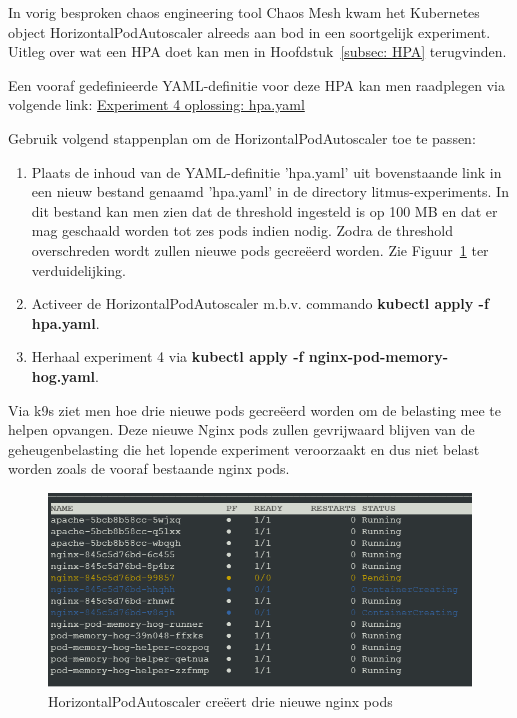 In vorig besproken chaos engineering tool Chaos Mesh kwam het Kubernetes object HorizontalPodAutoscaler alreeds aan bod in een soortgelijk experiment. Uitleg over wat een HPA doet kan men in Hoofdstuk~\ref{subsec: HPA} terugvinden.   

Een vooraf gedefinieerde YAML-definitie voor deze HPA kan men raadplegen via volgende link: \href{https://github.com/KenBruggeman/BP\textunderscore 21-22/blob/master/bachelorproef/docs/litmus%20experimenten/hpa.yaml}{Experiment 4 oplossing: hpa.yaml}

Gebruik volgend stappenplan om de HorizontalPodAutoscaler toe te passen:
\begin{enumerate}
    \item Plaats de inhoud van de YAML-definitie 'hpa.yaml' uit bovenstaande link in een nieuw bestand genaamd 'hpa.yaml' in de directory litmus-experiments. In dit bestand kan men zien dat de threshold ingesteld is op 100 MB en dat er mag geschaald worden tot zes pods indien nodig. Zodra de threshold overschreden wordt zullen nieuwe pods gecreëerd worden. Zie Figuur~\ref{img:threshold} ter verduidelijking.
    \item Activeer de HorizontalPodAutoscaler m.b.v. commando {\bf kubectl apply -f hpa.yaml}.
    \item Herhaal experiment 4 via {\bf kubectl apply -f nginx-pod-memory-hog.yaml}.
\end{enumerate}    
  
Via k9s ziet men hoe drie nieuwe pods gecreëerd worden om de belasting mee te helpen opvangen.
Deze nieuwe Nginx pods zullen gevrijwaard blijven van de geheugenbelasting die het lopende experiment veroorzaakt en dus niet belast worden zoals de vooraf bestaande nginx pods.  

\begin{figure}[h]
    \centering
    \includegraphics[scale=.9]{img/hpa_effect.png}
    \caption{HorizontalPodAutoscaler creëert drie nieuwe nginx pods}
    \label{img:threshold}
\end{figure}

